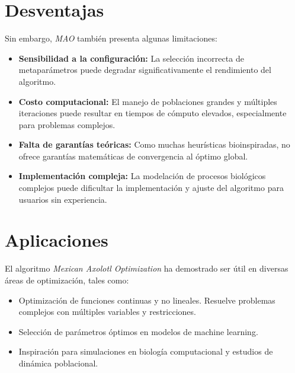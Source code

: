\section{Desventajas}

Sin embargo, \textit{MAO} también presenta algunas limitaciones:

\begin{itemize}
	\item \textbf{Sensibilidad a la configuración:} La selección incorrecta de metaparámetros puede degradar significativamente el rendimiento del algoritmo.
	\item \textbf{Costo computacional:} El manejo de poblaciones grandes y múltiples iteraciones puede resultar en tiempos de cómputo elevados, especialmente para problemas complejos.
	\item \textbf{Falta de garantías teóricas:} Como muchas heurísticas bioinspiradas, no ofrece garantías matemáticas de convergencia al óptimo global.
	\item \textbf{Implementación compleja:} La modelación de procesos biológicos complejos puede dificultar la implementación y ajuste del algoritmo para usuarios sin experiencia.
\end{itemize}

\section{Aplicaciones}

El algoritmo \textit{Mexican Axolotl Optimization} ha demostrado ser útil en diversas áreas de optimización, tales como:

\begin{itemize}
	\item Optimización de funciones continuas y no lineales. Resuelve problemas complejos con múltiples variables y restricciones.
	\item Selección de parámetros óptimos en modelos de machine learning.
	\item Inspiración para simulaciones en biología computacional y estudios de dinámica poblacional.
\end{itemize}
 
 